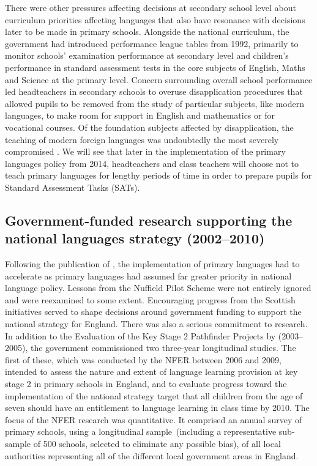 \documentclass[output=paper]{langscibook}
\begin{document}
There were other pressures affecting decisions at secondary school level about curriculum priorities affecting languages that also have resonance with decisions later to be made in primary schools. Alongside the national curriculum, the government had introduced performance league tables from 1992, primarily to monitor schools’ examination performance at secondary level and children’s performance in standard assessment tests in the core subjects of English, Maths and Science at the primary level. Concern surrounding overall school performance led headteachers in secondary schools to overuse disapplication procedures that allowed pupils to be removed from the study of particular subjects, like modern languages, to make room for support in English and mathematics or for vocational courses. Of the foundation subjects affected by disapplication, the teaching of modern foreign languages was undoubtedly the most severely compromised \citep{Morris2002}. We will see that later in the implementation of the primary languages policy from 2014, headteachers and class teachers will choose not to teach primary languages for lengthy periods of time in order to prepare pupils for Standard Assessment Tasks (SATs). 

\subsection{Government-funded research supporting the national languages strategy (2002--2010)}

Following the publication of \citet{Morris2002}, the implementation of primary languages had to accelerate as primary languages had assumed far greater priority in national language policy. Lessons from the Nuffield Pilot Scheme were not entirely ignored and were reexamined to some extent. Encouraging progress from the Scottish initiatives served to shape decisions around government funding to support the national strategy for England. There was also a serious commitment to research. In addition to the Evaluation of the Key Stage 2 Pathfinder Projects by \citeauthor{MuijsEtAl2005} (2003--2005), the government commissioned two three-year longitudinal studies. The first of these, which was conducted by the NFER between 2006 and 2009, intended to assess the nature and extent of language learning provision at key stage 2 in primary schools in England, and to evaluate progress toward the implementation of the national strategy target that all children from the age of seven should have an entitlement to language learning in class time by 2010. The focus of the NFER research was quantitative. It comprised an annual survey of primary schools, using a longitudinal sample~(including a representative sub-sample of 500 schools, selected to eliminate any possible bias), of all local authorities representing all of the different local government areas in England. 
\end{document}
